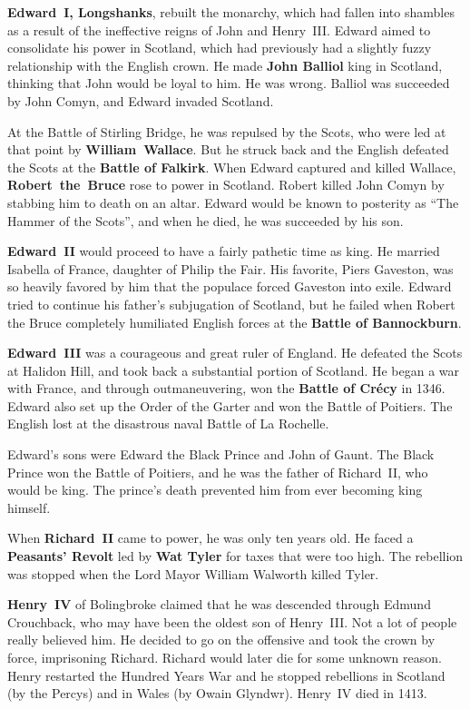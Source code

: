 \textbf{Edward~I, Longshanks}, rebuilt the monarchy,
which had fallen into shambles as a result of the ineffective reigns of John and Henry~III\@.
Edward aimed to consolidate his power in Scotland,
which had previously had a slightly fuzzy relationship with the English crown.
He made \textbf{John Balliol} king in Scotland, thinking that John would be loyal to him.
He was wrong.
Balliol was succeeded by John Comyn, and Edward invaded Scotland.

At the Battle of Stirling Bridge, he was repulsed by the Scots,
who were led at that point by \textbf{William~Wallace}.
But he struck back and the English defeated the Scots at the \textbf{Battle of Falkirk}.
When Edward captured and killed Wallace, \textbf{Robert~the~Bruce} rose to power in Scotland.
Robert killed John Comyn by stabbing him to death on an altar.
Edward would be known to posterity as ``The Hammer of the Scots'',
and when he died, he was succeeded by his son.

\textbf{Edward~II} would proceed to have a fairly pathetic time as king.
He married Isabella of France, daughter of Philip the Fair.
His favorite, Piers Gaveston, was so heavily favored by him that the populace forced Gaveston into exile.
Edward tried to continue his father's subjugation of Scotland,
but he failed when Robert the Bruce completely humiliated English forces at the \textbf{Battle of Bannockburn}.

\textbf{Edward~III} was a courageous and great ruler of England.
He defeated the Scots at Halidon Hill, and took back a substantial portion of Scotland.
He began a war with France, and through outmaneuvering, won the \textbf{Battle of Cr\'ecy} in 1346.
Edward also set up the Order of the Garter and won the Battle of Poitiers.
The English lost at the disastrous naval Battle of La Rochelle.

Edward's sons were Edward the Black Prince and John of Gaunt.
The Black Prince won the Battle of Poitiers, and he was the father of Richard~II, who would be king.
The prince's death prevented him from ever becoming king himself.

When \textbf{Richard~II} came to power, he was only ten years old.
He faced a \textbf{Peasants' Revolt} led by \textbf{Wat Tyler} for taxes that were too high.
The rebellion was stopped when the Lord Mayor William Walworth killed Tyler.

\textbf{Henry~IV} of Bolingbroke claimed that he was descended through Edmund Crouchback,
who may have been the oldest son of Henry~III\@.
Not a lot of people really believed him.
He decided to go on the offensive and took the crown by force, imprisoning Richard.
Richard would later die for some unknown reason.
Henry restarted the Hundred Years War and he stopped rebellions
in Scotland (by the Percys) and in Wales (by Owain Glyndwr).
Henry~IV died in 1413.


